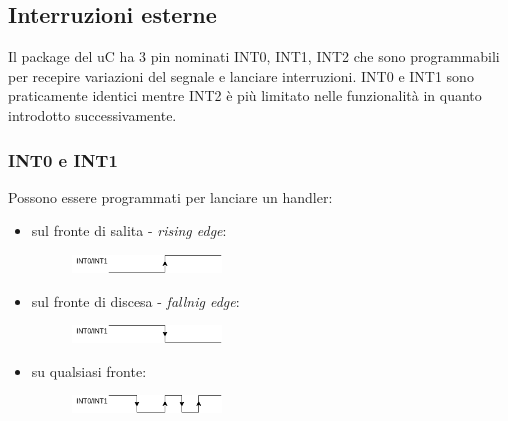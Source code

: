 \subsection{Interruzioni esterne}
Il package del uC ha 3 pin nominati INT0, INT1, INT2 che sono programmabili per recepire variazioni del segnale e lanciare interruzioni.
INT0 e INT1 sono praticamente identici mentre INT2 è più limitato nelle funzionalità in quanto introdotto successivamente.

\subsubsection{INT0 e INT1}
Possono essere programmati per lanciare un handler:
\begin{itemize}
    \item sul fronte di salita - \emph{rising edge}:
        \begin{figure}[H]
            \centering
            \includegraphics[width=150px]{images/15_Interrupt/rising_edge.png}
        \end{figure}
        
    \item sul fronte di discesa - \emph{fallnig edge}:
        \begin{figure}[H]
            \centering
            \includegraphics[width=150px]{images/15_Interrupt/falling_edge.png}
        \end{figure}

    \item su qualsiasi fronte:
        \begin{figure}[H]
            \centering
            \includegraphics[width=150px]{images/15_Interrupt/each_edge.png}
        \end{figure}


\end{itemize}
